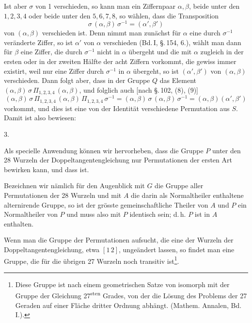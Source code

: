 
Ist aber $\sigma$ von 1 verschieden, so kann man ein Ziffernpaar $\alpha, \beta$, beide unter den $1,2,3,4$ oder beide unter den $5,6,7,8$, so wählen, dass die Transposition
\[
\sigma\,(\alpha,\beta)\,\sigma^{-1} = (\alpha', \beta')
\]
von $(\alpha, \beta)$ verschieden ist. Denn nimmt man zunächst für $\alpha$ eine durch $\sigma^{-1}$ veränderte Ziffer, so ist $\alpha'$ von $\alpha$ verschieden (Bd.\,I, \S.\,154, 6.), wählt man dann für $\beta$ eine Ziffer, die durch $\sigma^{-1}$ nicht in $\alpha$ übergeht und die mit $\alpha$ zugleich in der ersten oder in der zweiten Hälfte der acht Ziffern vorkommt, die gewiss immer existirt, weil nur eine Ziffer durch $\sigma^{-1}$ in $\alpha$ übergeht, so ist $(\alpha', \beta')$ von $(\alpha, \beta)$ verschieden. Dann folgt aber, dass in der Gruppe $Q$ das Element $(\alpha,\beta)\,\sigma\,\Pi_{1,2,3,4}\,(\alpha,\beta)$, und folglich auch [nach \S.\,102, (8), (9)]
\[
(\alpha,\beta)\,\sigma\,\Pi_{1,2,3,4}\,(\alpha,\beta)\,\Pi_{1,2,3,4}\,\sigma^{-1} = (\alpha,\beta)\,\sigma\,(\alpha,\beta)\,\sigma^{-1} = (\alpha,\beta)(\alpha',\beta')
\]
vorkommt, und dies ist eine von der Identität verschiedene Permutation aus $S$. Damit ist also bewiesen:

3.\ 

Als specielle Anwendung können wir hervorheben, dass die Gruppe $P$ unter den 28 Wurzeln der Doppeltangentengleichung nur Permutationen der ersten Art bewirken kann, und dass  ist.

Bezeichnen wir nämlich für den Augenblick mit $G$ die Gruppe aller Permutationen der 28 Wurzeln und mit $A$ die darin als Normaltheiler enthaltene alternirende Gruppe, so ist der grösste gemeinschaftliche Theiler von $A$ und $P$ ein Normaltheiler von $P$ und muss also mit $P$ identisch sein; d.\,h. $P$ ist in $A$ enthalten.

Wenn man die Gruppe der Permutationen aufsucht, die eine der Wurzeln der Doppeltangentengleichung, etwa $[1\,2]$, ungeändert lassen, so findet man eine Gruppe, die für die übrigen 27 Wurzeln noch transitiv ist\footnote{Diese Gruppe ist nach einem geometrischen Satze von  isomorph mit der Gruppe der Gleichung 27\textsuperscript{sten} Grades, von der die Lösung des Problems der 27 Geraden auf einer Fläche dritter Ordnung abhängt. (Mathem. Annalen, Bd.\,I.).}.
